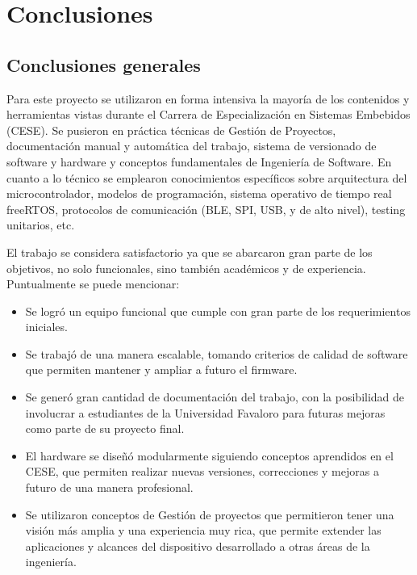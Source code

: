 
\chapter{Conclusiones} %

\label{Chapter5} %




\section{Conclusiones generales }

Para este proyecto se utilizaron en forma intensiva la mayoría de los contenidos y herramientas vistas durante el Carrera de Especialización en Sistemas Embebidos (CESE). Se pusieron en práctica técnicas de Gestión de Proyectos, documentación manual y automática del trabajo, sistema de versionado de software y hardware y conceptos fundamentales de Ingeniería de Software. En cuanto a lo técnico se emplearon conocimientos específicos sobre arquitectura del microcontrolador, modelos de programación, sistema operativo de tiempo real freeRTOS, protocolos de comunicación (BLE, SPI, USB, y de alto nivel), testing unitarios, etc.

El trabajo se considera satisfactorio ya que se abarcaron gran parte de los objetivos, no solo funcionales, sino también académicos y de experiencia. Puntualmente se puede mencionar:

\begin{itemize}

\item Se logró un equipo funcional que cumple con gran parte de los requerimientos iniciales.

\item Se trabajó de una manera escalable, tomando criterios de calidad de software que permiten mantener y ampliar a futuro el firmware.

\item Se generó gran cantidad de documentación del trabajo, con la posibilidad de involucrar a estudiantes de la Universidad Favaloro para futuras mejoras como parte de su proyecto final.

\item El hardware se diseñó modularmente siguiendo conceptos aprendidos en el CESE, que permiten realizar nuevas versiones, correcciones y mejoras a futuro de una manera profesional.

\item Se utilizaron conceptos de Gestión de proyectos que permitieron tener una visión más amplia y una experiencia muy rica, que permite extender las aplicaciones y alcances del dispositivo desarrollado a otras áreas de la ingeniería.

\end{itemize}

